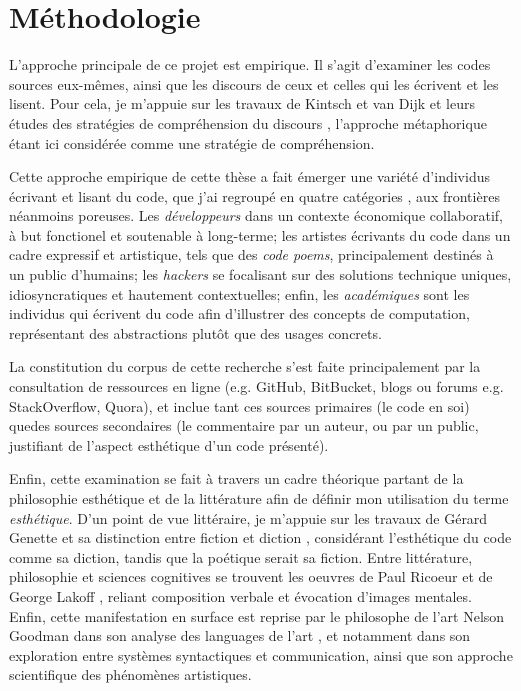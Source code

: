 \documentclass{article}
\begin{document}
\section{Méthodologie}

L'approche principale de ce projet est empirique. Il s'agit d'examiner les codes sources eux-mêmes, ainsi que les discours de ceux et celles qui les écrivent et les lisent. Pour cela, je m'appuie sur les travaux de Kintsch et van Dijk et leurs études des stratégies de compréhension du discours \citep{kintsch_model_1978}, l'approche métaphorique étant ici considérée comme une stratégie de compréhension.

Cette approche empirique de cette thèse a fait émerger une variété d'individus écrivant et lisant du code, que j'ai regroupé en quatre catégories \citep{hayes_cultures_2017}, aux frontières néanmoins poreuses. Les \emph{développeurs} dans un contexte économique collaboratif, à but fonctionel et soutenable à long-terme; les artistes écrivants du code dans un cadre expressif et artistique, tels que des \emph{code poems}, principalement destinés à un public d'humains; les \emph{hackers} se focalisant sur des solutions technique uniques, idiosyncratiques et hautement contextuelles; enfin, les \emph{académiques} sont les individus qui écrivent du code afin d'illustrer des concepts de computation, représentant des abstractions plutôt que des usages concrets.

La constitution du corpus de cette recherche s'est faite principalement par la consultation de ressources en ligne (e.g. GitHub, BitBucket, blogs ou forums e.g. StackOverflow, Quora), et inclue tant ces sources primaires (le code en soi) quedes sources secondaires (le commentaire par un auteur, ou par un public, justifiant de l'aspect esthétique d'un code présenté).

Enfin, cette examination se fait à travers un cadre théorique partant de la philosophie esthétique et de la littérature afin de définir mon utilisation du terme \emph{esthétique}. D'un point de vue littéraire, je m'appuie sur les travaux de Gérard Genette et sa distinction entre fiction et diction \citep{genette_fiction_1993}, considérant l'esthétique du code comme sa diction, tandis que la poétique serait sa fiction. Entre littérature, philosophie et sciences cognitives se trouvent les oeuvres de Paul Ricoeur \citep{ricoeur_rule_2003} et de George Lakoff \citep{lakoff_metaphors_1980}, reliant composition verbale et évocation d'images mentales. Enfin, cette manifestation en surface est reprise par le philosophe de l'art Nelson Goodman dans son analyse des languages de l'art \citep{goodman_languages_1976}, et notamment dans son exploration entre systèmes syntactiques et communication, ainsi que son approche scientifique des phénomènes artistiques.
\end{document}
